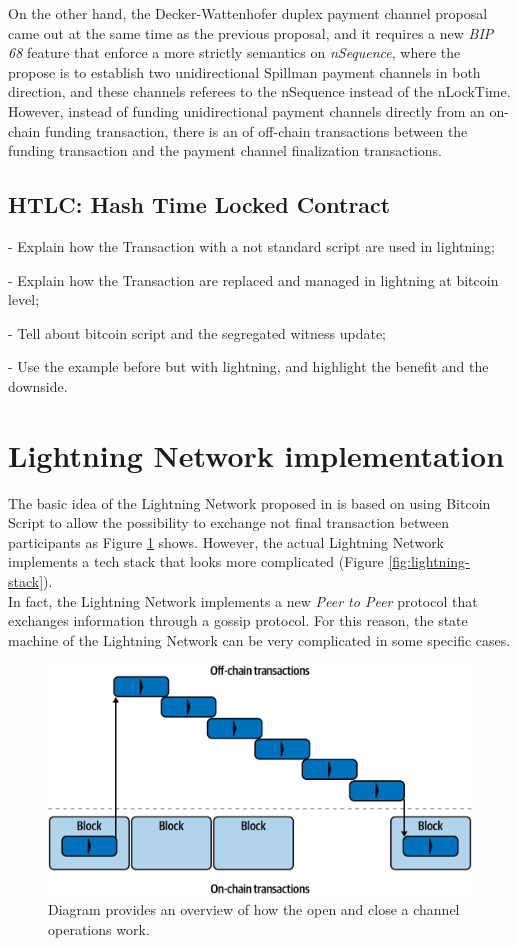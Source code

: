On the other hand, the Decker-Wattenhofer duplex payment channel proposal came out at the same time as the previous proposal, and
it requires a new \emph{BIP 68}\cite{bip68} feature that enforce a more strictly semantics on \emph{nSequence}, where the propose is to
establish two unidirectional Spillman payment channels in both
direction, and these channels referees to the nSequence instead of the nLockTime.
However, instead of funding unidirectional payment channels directly from an on-chain funding transaction, there is an  of off-chain transactions between the funding transaction and the payment channel finalization transactions.

\subsection{HTLC: Hash Time Locked Contract}
\label{sec:htlc_intro}

- Explain how the Transaction with a not standard script are used in lightning;

- Explain how the Transaction are replaced and managed in lightning at bitcoin level;

- Tell about bitcoin script and the segregated witness update;

- Use the example before but with lightning, and highlight the benefit and the downside.

\section{Lightning Network implementation}

The basic idea of the Lightning Network proposed in \cite{lightning-network-paper} is based on using Bitcoin Script
to allow the possibility to exchange not final transaction between participants as Figure \ref{fig:ln-onchain} shows.
However, the actual Lightning Network implements a tech stack that looks more complicated (Figure \ref{fig:lightning-stack}).\\
In fact, the Lightning Network implements a new \emph{Peer to Peer} protocol that exchanges information through
a gossip protocol. For this reason, the state machine of the Lightning Network
can be very complicated in some specific cases.

\begin{figure}[h]
  \begin{center}
  \includegraphics[width=0.6\columnwidth]{imgs/mtln_0702.png}
  \end{center}
  \caption{Diagram provides an overview of how the open and close a channel operations work.}
  \label{fig:ln-onchain}
\end{figure}


